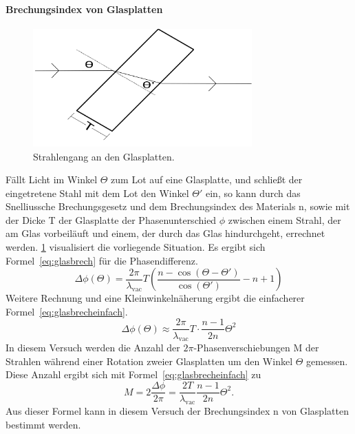\paragraph{Brechungsindex von Glasplatten}
%
\begin{figure}
  \centering
  \includegraphics[width=0.75\textwidth]{figures/glasbrech}
  \caption{%
    Strahlengang an den Glasplatten.
  }%
  \label{fig:brechglas}
\end{figure}
%
Fällt Licht im Winkel $\Theta$ zum Lot auf eine Glasplatte, 
und schließt der eingetretene Stahl mit dem Lot den Winkel $\Theta'$ ein, 
so kann durch das 
Snelliussche Brechungsgesetz und dem Brechungsindex des Materials n, 
sowie mit der Dicke T der Glasplatte der Phasenunterschied $\phi$ zwischen 
einem Strahl, der am Glas vorbeiläuft und einem, der durch das Glas 
hindurchgeht, errechnet werden. 
\cref{fig:brechglas} visualisiert die vorliegende Situation.
Es ergibt sich 
Formel~\eqref{eq:glasbrech} für die Phasendifferenz.
\begin{equation}
\Delta\phi(\Theta) = \frac{2\pi}{\lambda_\text{vac}}T\left(
\frac{n-\cos(\Theta - \Theta')}{\cos(\Theta')} - n+1\right)
\label{eq:glasbrech}
\end{equation}
Weitere Rechnung und eine Kleinwinkelnäherung ergibt die einfacherer 
Formel~\eqref{eq:glasbrecheinfach}.
\begin{equation}
\Delta\phi(\Theta) \approx \frac{2\pi}{\lambda_\text{vac}}T\cdot
\frac{n-1}{2n}\Theta^2
\label{eq:glasbrecheinfach}
\end{equation}
In diesem Versuch werden die Anzahl der $2\pi$-Phasenverschiebungen M
der Strahlen während einer Rotation zweier Glasplatten um den Winkel 
$\Theta$ gemessen. Diese Anzahl ergibt sich mit 
Formel~\eqref{eq:glasbrecheinfach} zu
\begin{equation}
M = 2\frac{\Delta\phi}{2\pi} = \frac{2T}{\lambda_\text{vac}}
\frac{n-1}{2n}\Theta^2.
\label{eq:glasfringes}
\end{equation}
Aus dieser Formel kann in diesem Versuch der Brechungsindex n von 
Glasplatten bestimmt werden.\\
